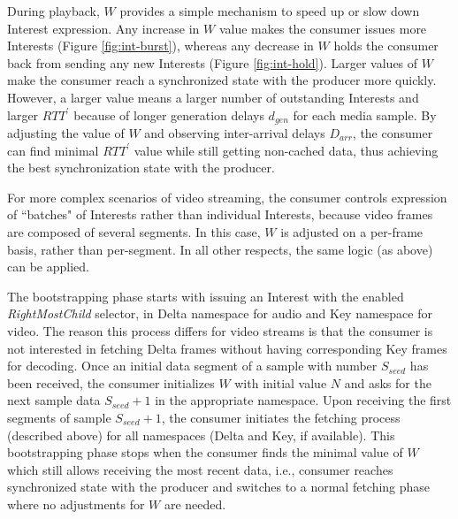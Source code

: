 \documentclass{icn/sig-alternate-2012} %
\begin{document}
During playback, $W$ provides a simple mechanism to speed up or slow down Interest expression. Any increase in $W$ value makes the consumer issues more Interests (Figure \ref{fig:int-burst}), whereas any decrease in $W$ holds the consumer back from sending any new Interests (Figure \ref{fig:int-hold}). Larger values of $W$ make the consumer reach a synchronized state with the producer more quickly. However, a larger value means a larger number of outstanding Interests and larger $RTT^\prime$ because of longer generation delays $d_{gen}$ for each media sample. By adjusting the value of $W$ and observing inter-arrival delays $D_{arr}$, the consumer can find minimal $RTT^\prime$ value while still getting non-cached data, thus achieving the best synchronization state with the producer.

For more complex scenarios of video streaming, the consumer controls expression of ``batches" of Interests rather than individual Interests, because video frames are composed of several segments. In this case, $W$ is adjusted on a per-frame basis, rather than per-segment. In all other respects, the same logic (as above) can be applied.

The bootstrapping phase starts with issuing an Interest with the enabled \textit{RightMostChild} selector, in Delta namespace for audio and Key namespace for video. The reason this process differs for video streams is that the consumer is not interested in fetching Delta frames without having corresponding Key frames for decoding. Once an initial data segment of a sample with number $S_{seed}$ has been received, the consumer initializes $W$ with initial value $N$ and asks for the next sample data $S_{seed}+1$ in the appropriate namespace. Upon receiving the first segments of sample $S_{seed}+1$, the consumer initiates the fetching process (described above) for all namespaces (Delta and Key, if available). This bootstrapping phase stops when the consumer finds the minimal value of $W$ which still allows receiving the most recent data, i.e., consumer reaches synchronized state with the producer and switches to a normal fetching phase where no adjustments for $W$ are needed. 


\end{document}
